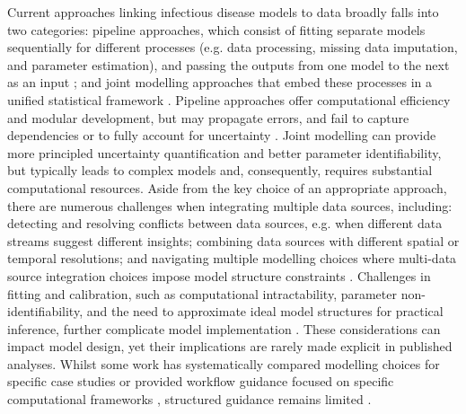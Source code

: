 \documentclass{article}
\begin{document}
Current approaches linking infectious disease models to data broadly falls into two categories: pipeline approaches, which consist of fitting separate models sequentially for different processes (e.g. data processing, missing data imputation, and parameter estimation), and passing the outputs from one model to the next as an input \cite{mitchell2022fair}; and joint modelling approaches that embed these processes in a unified statistical framework \citep{deangelis2018analysing}.
Pipeline approaches offer computational efficiency and modular development, but may propagate errors, and fail to capture dependencies or to fully account for uncertainty \citep{lison2024generative, Ward2024-sp}.
Joint modelling can provide more principled uncertainty quantification and better parameter identifiability, but typically leads to complex models and, consequently, requires substantial computational resources\citep{deangelis2015four,russell2024combined, lison2024generative}.
Aside from the key choice of an appropriate approach, there are numerous challenges when integrating multiple data sources, including: detecting and resolving conflicts between data sources, e.g. when different data streams suggest different insights; combining data sources with different spatial or temporal resolutions; and navigating multiple modelling choices where multi-data source integration choices impose model structure constraints \citep{deangelis2018analysing, nicholson2022interoperability}.
Challenges in fitting and calibration, such as computational intractability, parameter non-identifiability, and the need to approximate ideal model structures for practical inference, further complicate model implementation \citep{corbella2022inferring, Ward2024-sp}.
These considerations can impact model design, yet their implications are rarely made explicit in published analyses.
Whilst some work has systematically compared modelling choices for specific case studies \citep{bouman2024bayesian} or provided workflow guidance focused on specific computational frameworks \citep{grinsztajn2021bayesian}, structured guidance remains limited \citep{Behrend2020-au, nicholson2022interoperability, deangelis2018analysing}.
\end{document}
